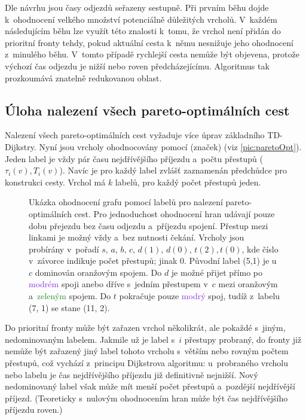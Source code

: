 Dle návrhu jsou časy odjezdů seřazeny sestupně. Při prvním běhu dojde k~ohodnocení velkého množství potenciálně důležitých vrcholů. V~každém následujícím běhu lze využít této znalosti k~tomu, že vrchol není přidán do prioritní fronty tehdy, pokud aktuální cesta k~němu nesnižuje jeho ohodnocení z~minulého běhu. V~tomto případě rychlejší cesta nemůže být objevena, protože výchozí čas odjezdu je nižší nebo roven předcházejícímu. Algoritmus tak prozkoumává znatelně redukovanou oblast.

\subsection{Úloha nalezení všech pareto-optimálních cest}
Nalezení všech pareto-optimálních cest vyžaduje více úprav základního TD-Dijkstry. Nyní jsou vrcholy ohodnocovány pomocí  (značek) (viz \autoref{pic:paretoOpt}). Jeden label je vždy pár času nejdřívějšího příjezdu a~počtu přestupů ($\tau_i(v), T_i(v)$). Navíc je pro každý label zvlášť zaznamenán předchůdce pro konstrukci cesty. Vrchol má $k$ labelů, pro každý počet přestupů jeden.

\begin{figure}[htbp]
	\centering
	\paretoOptimal
	\caption[Ukázka ohodnocení grafu pomocí labelů pro nalezení pareto-optimálních cest.]{Ukázka ohodnocení grafu pomocí labelů pro nalezení pareto-optimálních cest. Pro jednoduchost ohodnocení hran udávají pouze dobu přejezdu bez času odjezdu a~příjezdu spojení. Přestup mezi linkami je možný vždy a~bez nutnosti čekání. Vrcholy jsou probírány v~pořadí \(s,\,a,\,b,\,c,\,d(1),\,d(0),\,t(2), t(0)\), kde číslo v~závorce indikuje počet přestupů; jinak 0. Původní label (5,1) je u~\(c\) dominován \textcolor{RedOrange}{oranžovým} spojem. Do \(d\) je možné přijet přímo po \textcolor{BlueViolet}{modrém} spoji anebo dříve s~jedním přestupem v~\(c\) mezi \textcolor{RedOrange}{oranžovým} a~\textcolor{ForestGreen}{zeleným} spojem. Do \(t\) pokračuje pouze \textcolor{BlueViolet}{modrý} spoj, tudíž z~labelu (7, 1) se stane (11, 2).}
	\label{pic:paretoOpt}
\end{figure}

Do prioritní fronty může být zařazen vrchol několikrát, ale pokaždé s~jiným, nedominovaným labelem. Jakmile už je label s~\(i\) přestupy probraný, do fronty již nemůže být zařazený jiný label tohoto vrcholu s~větším nebo rovným počtem přestupů, což vychází z~principu Dijkstrova algoritmu: u~probraného vrcholu nebo labelu je čas nejdřívějšího příjezdu již definitivně nejnižší. Nový nedominovaný label však může mít menší počet přestupů a~pozdější nejdřívější příjezd. (Teoreticky s~nulovým ohodnocením hran může být čas nejdřívějšího příjezdu roven.)

